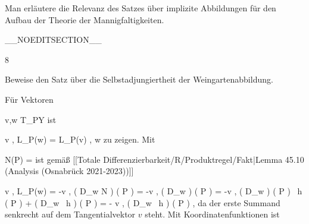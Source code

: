 {

Man erläutere die Relevanz des Satzes über implizite Abbildungen für den Aufbau der Theorie der Mannigfaltigkeiten.

}
{  }

__NOEDITSECTION__

{8}

{

Beweise den Satz über die Selbstadjungiertheit der Weingartenabbildung.

}
{

Für Vektoren

\mavergleichskette
{\vergleichskette
{ v,w
}
{ \in }{ T_PY
}
{  }{
}
{    }{
}
{   }{
}
}
{}{}{}
ist

\mavergleichskettedisp
{\vergleichskette
{ \left\langle  v  ,  L_P(w)  \right\rangle
}
{ =} { \left\langle L_P(v) ,  w  \right\rangle
}
{ } {
}
{ } {
}
{ } {
}
}
{}{}{}
zu zeigen. Mit

\mavergleichskette
{\vergleichskette
{ N(P)
}
{ = }{ {  }
}
{  }{
}
{    }{
}
{   }{
}
}
{}{}{}
ist gemäß
[[Totale Differenzierbarkeit/R/Produktregel/Fakt|Lemma 45.10 (Analysis (Osnabrück 2021-2023))]]

\mavergleichskettealignhandlinks
{\vergleichskettealignhandlinks
{ \left\langle  v  ,  L_P(w)  \right\rangle
}
{ =} { -\left\langle  v  ,  \left(  D_{w}  N   \right) \left(   P   \right)   \right\rangle
}
{ =} { -\left\langle  v  ,  \left(  D_{w}  {  }   \right) \left(   P   \right)     \right\rangle
}
{ =} { -\left\langle  v  ,  \left(  D_{w}  {  }   \right) \left(   P   \right) \cdot
{} \,  h  (  P ) + {  } \cdot  \left(  D_{w}
 \,  h   \right) \left(   P   \right)   \right\rangle
}
{ =} { - {  } \left\langle  v  ,  \left(  D_{w}
 \,  h   \right) \left(   P   \right)    \right\rangle
}
}
{}
{}{,}
da der erste Summand senkrecht auf dem Tangentialvektor $v$ steht. Mit Koordinatenfunktionen ist

}
